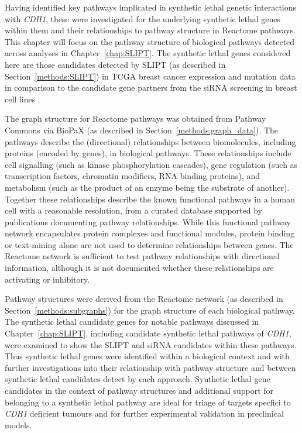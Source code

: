 Having identified key pathways implicated in synthetic lethal genetic interactions with \textit{CDH1}, these were investigated for the underlying synthetic lethal genes within them and their relationships to pathway structure in Reactome pathways. This chapter will focus on the pathway structure of biological pathways detected across analyses in Chapter~\ref{chap:SLIPT}. The synthetic lethal genes considered here are those candidates detected by SLIPT (as described in Section~\ref{methods:SLIPT}) in TCGA breast cancer expression and mutation data \citep{TCGA2012} in comparison to the candidate gene partners from the siRNA screening in breast cell lines \citep{Telford2015}. 

The graph structure for Reactome pathways was obtained from Pathway Commons via BioPaX (as described in Section~\ref{methods:graph_data}). The pathways describe the (directional) relationships between biomolecules, including proteins (encoded by genes), in biological pathways. These relationships include cell signalling (such as kinase phosphorylation cascades), gene regulation (such as transcription factors, chromatin modifiers, RNA binding proteins), and metabolism (such as the product of an enzyme being the substrate of another). Together these relationships describe the known functional pathways in a human cell with a reasonable resolution, from a curated database supported by publications documenting pathway relationships.  While this functional pathway network encapsulates protein complexes and functional modules, protein binding or text-mining alone are not used to determine relationships between genes. The Reactome network is sufficient to test pathway relationships with directional information, although it is not documented whether these relationships are activating or inhibitory.

Pathway structures were derived from the Reactome network (as described in Section~\ref{methods:subgraphs}) for the graph structure of each biological pathway. The synthetic lethal candidate genes for notable pathways discussed in Chapter~\ref{chap:SLIPT}, including candidate synthetic lethal pathways of \textit{CDH1}, were examined to show the SLIPT and siRNA candidates within these pathways. Thus synthetic lethal genes were identified within a biological context and with further investigations into their relationship with pathway structure and between synthetic lethal candidates detect by each approach. Synthetic lethal gene candidates in the context of pathway structures and additional support for belonging to a synthetic lethal pathway are ideal for triage of targets specfici to \textit{CDH1} deficient tumours and for further experimental validation in preclinical models.

